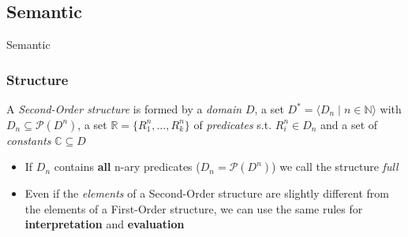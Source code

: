 \documentclass{beamer}
\begin{document}
            \subsection{Semantic}
                \begin{frame}
                    \begin{center}
                        \begin{Huge}
                            \textcolor{title_blue}{Semantic}
                        \end{Huge}
                    \end{center}
                \end{frame}

                \begin{frame}
                    \frametitle{Structure}
                    \begin{definition}
                        A \textit{Second-Order structure} is formed by a \textit{domain} $ D $, a set $ D^* = \langle D_n\; \vert\; n \in \mathbb{N} \rangle$ with $ D_n \subseteq \mathcal{P}(D^n) $, a set $ \mathbb{R} = \{ R_1^n, \dots, R_k^n \} $ of \textit{predicates} s.t. $ R_i^n \in D_n $ and a set of \textit{constants} $ \mathbb{C} \subseteq D $
                    \end{definition}
                    \begin{itemize}
                        \item If $ D_n $ contains \textbf{all} n-ary predicates ($ D_n = \mathcal{P}(D^n) $) we call the structure \textit{full}
                        \item Even if the \textit{elements} of a Second-Order structure are slightly different from the elements of a First-Order structure, we can use the same rules for \textbf{interpretation} and \textbf{evaluation}
                    \end{itemize}
                \end{frame}
                
\end{document}
